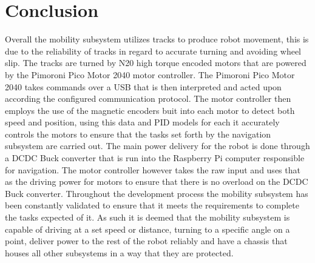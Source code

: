 \documentclass{article}
\begin{document}
\section{Conclusion}
Overall the mobility subsystem utilizes tracks to produce robot movement, this is due to the reliability of tracks in regard to accurate turning and avoiding wheel slip.
The tracks are turned by N20 high torque encoded motors that are powered by the Pimoroni Pico Motor 2040 motor controller. The Pimoroni Pico Motor 2040 takes commands over
a USB that is then interpreted and acted upon according the configured communication protocol. The motor controller then employs the use of the magnetic encoders buit into
each motor to detect both speed and position, using this data and PID models for each it accurately controls the motors to ensure that the tasks set forth by the navigation
subsystem are carried out. The main power delivery for the robot is done through a DCDC Buck converter that is run into the Raspberry Pi computer responsible for navigation.
The motor controller however takes the raw input and uses that as the driving power for motors to ensure that there is no overload on the DCDC Buck converter. Throughout the
development process the mobility subsystem has been constantly validated to ensure that it meets the requirements to complete the tasks expected of it. As such it is deemed
that the mobility subsystem is capable of driving at a set speed or distance, turning to a specific angle on a point, deliver power to the rest of the robot reliably and
have a chassis that houses all other subsystems in a way that they are protected.
\end{document}
